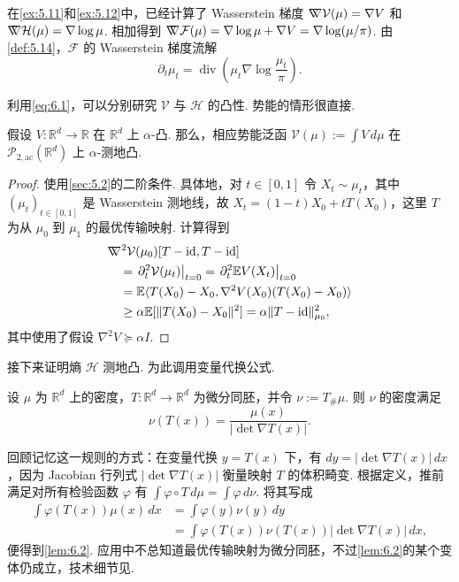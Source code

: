 在\autoref{ex:5.11}和\autoref{ex:5.12}中，已经计算了 Wasserstein 梯度 $\nabla\mkern-10mu\nabla\mathcal V(\mu)=\nabla V$ 和 $\nabla\mkern-10mu\nabla\mathcal H(\mu)=\nabla\log\mu$. 相加得到 $\nabla\mkern-10mu\nabla\mathcal F(\mu)=\nabla\log\mu+\nabla V=\nabla\log(\mu/\pi)$. 由\autoref{def:5.14}，$\mathcal F$ 的 Wasserstein 梯度流解
\begin{equation}\label{eq:6.2}
\partial_t\mu_t=\operatorname{div}\left(\mu_t\nabla\log\frac{\mu_t}\pi\right).
\end{equation}

利用\eqref{eq:6.1}，可以分别研究 $\mathcal V$ 与 $\mathcal H$ 的凸性. 势能的情形很直接.

\begin{theorem}\label{thm:6.1}
假设 $V:\mathbb R^d\to\mathbb R$ 在 $\mathbb R^d$ 上 $\alpha$-凸. 那么，相应势能泛函 $\mathcal V(\mu):=\int V\,d\mu$ 在 $\mathcal P_{2,\mathrm{ac}}(\mathbb R^d)$ 上 $\alpha$-测地凸.
\end{theorem}
\begin{proof}
使用\autoref{sec:5.2}的二阶条件. 具体地，对 $t\in[0,1]$ 令 $X_t\sim\mu_t$，其中 $(\mu_t)_{t\in[0,1]}$ 是 Wasserstein 测地线，故 $X_t=(1-t)X_0+tT(X_0)$，这里 $T$ 为从 $\mu_0$ 到 $\mu_1$ 的最优传输映射. 计算得到
$$
\begin{aligned}
&\nabla\mkern-10mu\nabla^2\mathcal V(\mu_0)[T-\mathrm{id},T-\mathrm{id}]\\
&\quad=\left.\partial_t^2\mathcal V(\mu_t)\right|_{t=0}
=\left.\partial_t^2\mathbb EV(X_t)\right|_{t=0}\\
&\quad=\mathbb E\langle T(X_0)-X_0,\nabla^2V(X_0)(T(X_0)-X_0)\rangle\\
&\quad\geq\alpha\mathbb E[\|T(X_0)-X_0\|^2]
=\alpha\|T-\mathrm{id}\|_{\mu_0}^2,
\end{aligned}
$$
其中使用了假设 $\nabla^2V\succeq\alpha I$.
\end{proof}

接下来证明熵 $\mathcal H$ 测地凸. 为此调用变量代换公式.

\begin{lemma}[变量代换]\label{lem:6.2}
设 $\mu$ 为 $\mathbb R^d$ 上的密度，$T:\mathbb R^d\to\mathbb R^d$ 为微分同胚，并令 $\nu:=T_\#\mu$. 则 $\nu$ 的密度满足
$$
\nu(T(x))=\frac{\mu(x)}{|\det\nabla T(x)|}.
$$
\end{lemma}

回顾记忆这一规则的方式：在变量代换 $y=T(x)$ 下，有 $dy=|\det\nabla T(x)|\,dx$，因为 Jacobian 行列式 $|\det\nabla T(x)|$ 衡量映射 $T$ 的体积畸变. 根据定义，推前满足对所有检验函数 $\varphi$ 有 $\int\varphi\circ T\,d\mu=\int\varphi\,d\nu$. 将其写成
$$
\begin{aligned}
\int\varphi(T(x))\mu(x)\,dx
&=\int\varphi(y)\nu(y)\,dy\\
&=\int\varphi(T(x))\nu(T(x))|\det\nabla T(x)|\,dx,
\end{aligned}
$$
便得到\autoref{lem:6.2}. 应用中不总知道最优传输映射为微分同胚，不过\autoref{lem:6.2}的某个变体仍成立，技术细节见\cite[定理 4.8]{ref315}.

